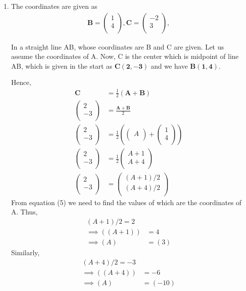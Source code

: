 \documentclass[12pt]{article}
\providecommand{\brak}[1]{\ensuremath{\left(#1\right)}}
\newcommand{\myvec}[1]{\ensuremath{\begin{pmatrix}#1\end{pmatrix}}}
\let\vec\mathbf
\begin{document}
\begin{enumerate}
\item The coordinates are given as
	\begin{align}
	\vec{B} = \myvec{
		1\\
	    4\\
		},
	\vec{C} = \myvec{
	   -2\\
		3\\
		},
	\end{align}
	
In a straight line AB, whose coordinates are B and C are given.
Let us assume the coordinates of A. Now, C is the center which is midpoint of line AB, which is given in the start as $\vec{C(2, -3)}$ and we have $\vec{B(1,4)}$.
		
Hence,	
	\begin{align}
	\vec{C} &= \frac{1}{2}\vec{(A+B)}\\
	\myvec{
	    2\\
	   -3\\
		} &= \frac{\vec{A+B}}{2} \\
		\myvec{
	    2\\
	   -3\\
		} &= \frac{1}{2}\brak{\myvec{A\\}+\myvec{1\\4\\}} \\
		\myvec{
	    2\\
	   -3\\
		} &= \frac{1}{2}\myvec{A+1\\A+4\\}\\
		\myvec{
	    2\\
	   -3\\
		} &= \myvec{(A+1)/2\\(A+4)/2\\}	
	\end{align}       
	 From equation (5) we need to find the values of which are the coordinates of A. Thus,
    \begin{align}	                     
	{(A+1)/2} = 2\\
	\implies  
	\brak{(A+1)}& = 4 \\
	\implies 
	\brak{A}& = (3)
    \end{align}
    Similarly,
    \begin{align}
    {(A+4)/2} = -3\\
    \implies
    \brak{(A+4)}& = -6 \\
    \implies
    \brak {A}& = (-10)

\end{align}
\end{enumerate}
\end{document}

